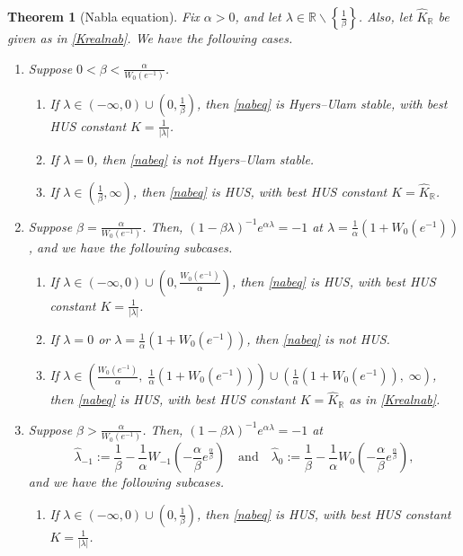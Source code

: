 \documentclass[12pt,reqno]{amsart}
\theoremstyle{plain}
\newtheorem{theorem}{Theorem}
\theoremstyle{definition}
\newcommand{\R}{\ensuremath{\mathbb{R}}}
\numberwithin{equation}{section}
\numberwithin{theorem}{section}
\begin{document}
\begin{theorem}[Nabla equation]\label{realnablaHUS}
Fix $\alpha>0$, and let $\lambda\in\R\backslash\left\{\frac{1}{\beta}\right\}$. Also, let $\widehat{K}_{\R}$ be given as in \eqref{Krealnab}. We have the following cases.
\begin{enumerate}
 \item Suppose $0<\beta<\frac{\alpha}{W_0(e^{-1})}$.
  \begin{enumerate}
    \item If $\lambda\in(-\infty,0)\cup\left(0,\frac{1}{\beta}\right)$, then \eqref{nabeq} is Hyers--Ulam stable, with best HUS constant 
		      $K=\frac{1}{|\lambda|}$. 
    \item If $\lambda=0$, then \eqref{nabeq} is not Hyers--Ulam stable. 
    \item If $\lambda\in\left(\frac{1}{\beta},\infty\right)$, then \eqref{nabeq} is HUS, with best HUS constant $K=\widehat{K}_{\R}$.
  \end{enumerate}
\item Suppose $\beta=\frac{\alpha}{W_0(e^{-1})}$. Then, $(1-\beta\lambda)^{-1}e^{\alpha\lambda}=-1$ at $\lambda=\frac{1}{\alpha}\left(1+W_0(e^{-1})\right)$, and we have the following subcases.
\begin{enumerate}
    \item If $\lambda\in(-\infty,0)\cup\left(0,\frac{W_0(e^{-1})}{\alpha}\right)$, then \eqref{nabeq} is HUS, with best HUS constant 
          $K=\frac{1}{|\lambda|}$. 
    \item If $\lambda=0$ or $\lambda=\frac{1}{\alpha}\left(1+W_0(e^{-1})\right)$, then \eqref{nabeq} is not HUS.
    \item If $\lambda\in\left(\frac{W_0(e^{-1})}{\alpha},\;\frac{1}{\alpha}\left(1+W_0(e^{-1})\right)\right)\cup\left(\frac{1}{\alpha}\left(1+W_0(e^{-1})\right),\;\infty\right)$, then \eqref{nabeq} is HUS, with best HUS constant $K=\widehat{K}_{\R}$ as in \eqref{Krealnab}.
\end{enumerate}
\item Suppose $\beta>\frac{\alpha}{W_0(e^{-1})}$. Then, $(1-\beta\lambda)^{-1}e^{\alpha\lambda}=-1$ at 
      $$ \widehat{\lambda}_{-1}:=\frac{1}{\beta}-\frac{1}{\alpha}W_{-1}\left(-\frac{\alpha}{\beta}e^{\frac{\alpha}{\beta}}\right) \quad\text{and}\quad   
			\widehat{\lambda}_{0}:=\frac{1}{\beta}-\frac{1}{\alpha}W_{0}\left(-\frac{\alpha}{\beta}e^{\frac{\alpha}{\beta}}\right), $$ 
			and we have the following subcases.
\begin{enumerate}
\item If $\lambda\in(-\infty,0)\cup\left(0,\frac{1}{\beta}\right)$, then \eqref{nabeq} is HUS, with best HUS constant $K=\frac{1}{|\lambda|}$. 

\end{enumerate}
\end{enumerate}
\end{theorem}
\end{document}
